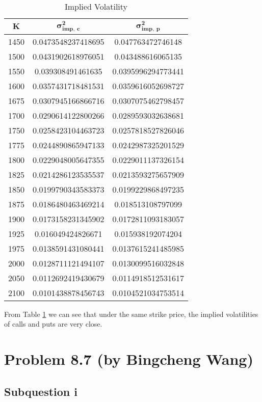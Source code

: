 \documentclass{article}
\DeclareMathOperator{\1}{\mathit{1}}
\numberwithin{figure}{section} %
\numberwithin{table}{section}
\begin{document}
	\begin{table}[hbtp]
	\centering
    \caption{\label{tab:impVol}%
    Implied Volatility}
    \small
    \begin{tabular}{ccc}
    \hline\hline
    $\mathbf{K}$ & $\mathbf{\sigma^2_{imp,~c}}$ & $\mathbf{\sigma^2_{imp,~p}}$\\ 
    \hline
1450 & 0.0473548237418695 & 0.047763472746148\\
1500 & 0.0431902618976051 & 0.043488616065135\\
1550 & 0.039308491461635 & 0.0395996294773441\\
1600 & 0.0357431718481531 & 0.0359616052698727\\
1675 & 0.0307945166866716 & 0.0307075462798457\\
1700 & 0.0290614122800266 & 0.0289593032638681\\
1750 & 0.0258423104463723 & 0.0257818527826046\\
1775 & 0.0244890865947133 & 0.0242987325201529\\
1800 & 0.0229048005647355 & 0.0229011137326154\\
1825 & 0.0214286123535537 & 0.0213593275657909\\
1850 & 0.0199790343583373 & 0.0199229868497235\\
1875 & 0.0186480463469214 & 0.018513108797099\\
1900 & 0.0173158231345902 & 0.0172811093183057\\
1925 & 0.016049424826671 & 0.015938192074204\\
1975 & 0.0138591431080441 & 0.0137615241485985\\
2000 & 0.0128711121494107 & 0.0130099516032848\\
2050 & 0.0112692419430679 & 0.0114918512531617\\
2100 & 0.0101438878456743 & 0.0104521034753514\\
    \hline\hline
    \end{tabular}
    \end{table}

From Table \ref{tab:impVol} we can see that under the same strike price, the implied volatilities of calls and puts are very close.
\section{Problem 8.7 (by Bingcheng Wang)}
\subsection{Subquestion i}
\end{document}
